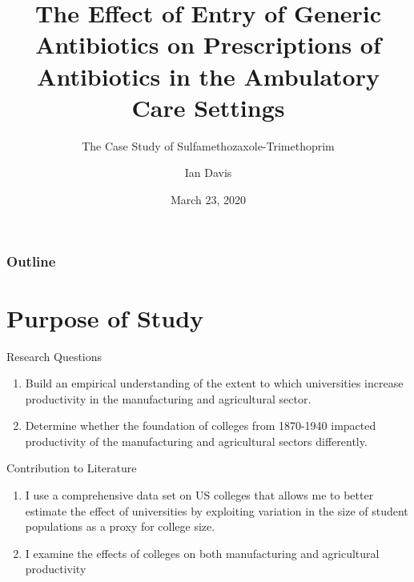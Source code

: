 \documentclass{beamer}
\title{The Effect of Entry of Generic Antibiotics on Prescriptions of Antibiotics in the Ambulatory Care Settings}
\subtitle{The Case Study of Sulfamethozaxole-Trimethoprim}
\author{Ian Davis}
\institute{Clemson University}
\date{March 23, 2020}
\begin{document}
\begin{frame}
\titlepage
\end{frame}

\begin{frame}
\frametitle{Outline}
\tableofcontents
\end{frame}

\section{Purpose of Study}
\begin{frame}{Research Questions}
\begin{enumerate}
\item Build an empirical understanding of the extent to which  universities increase productivity in the manufacturing and agricultural sector.
\item Determine whether the foundation of colleges from 1870-1940 impacted productivity of the manufacturing and agricultural sectors differently.
\end{enumerate}
\end{frame}

\begin{frame}{Contribution to Literature}
\begin{enumerate}
\item I use a comprehensive data set on US colleges that allows me to better estimate the effect of universities by exploiting variation in the size of student populations as a proxy for college size.
\item I examine the effects of colleges on both manufacturing and agricultural productivity
\end{enumerate}
\end{frame}
\end{document}
